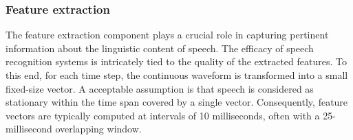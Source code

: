 \subsubsection{Feature extraction}%
\label{subsection:features}
The feature extraction component plays a crucial role in capturing pertinent information about the linguistic content of speech. The efficacy of speech recognition systems is intricately tied to the quality of the extracted features. To this end, for each time step, the continuous waveform is transformed into a small fixed-size vector. A acceptable assumption is that speech is considered as stationary within the time span covered by a single vector. Consequently, feature vectors are typically computed at intervals of 10 milliseconds, often with a 25-millisecond overlapping window.

